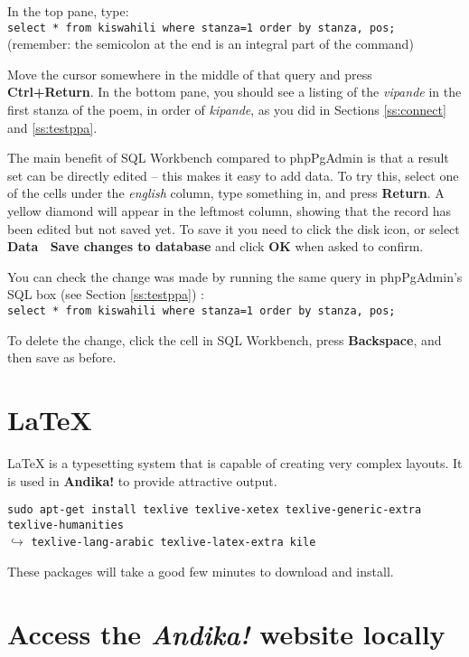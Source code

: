 \documentclass[a4paper,10pt]{article}
\begin{document}
In the top pane, type:\\
\verb|select * from kiswahili where stanza=1 order by stanza, pos;|\\
(remember: the semicolon at the end is an integral part of the command)

Move the cursor somewhere in the middle of that query and press \textbf{Ctrl+Return}.  In the bottom pane, you should see a listing of the \textit{vipande} in the first stanza of the poem, in order of \textit{kipande}, as you did in Sections \ref{ss:connect} and \ref{ss:testppa}.

The main benefit of SQL Workbench compared to phpPgAdmin is that a result set can be directly edited -- this makes it easy to add data.  To try this, select one of the cells under the \textit{english} column, type something in, and press \textbf{Return}.  A yellow diamond will appear in the leftmost column, showing that the record has been edited but not saved yet. To save it you need to click the disk icon, or select \textbf{Data \textrightarrow\ Save changes to database} and click \textbf{OK} when asked to confirm.

You can check the change was made by running the same query in phpPgAdmin's SQL box (see Section \ref{ss:testppa}) :\\
\verb|select * from kiswahili where stanza=1 order by stanza, pos;|

To delete the change, click the cell in SQL Workbench, press \textbf{Backspace}, and then save as before.


\section{LaTeX}

LaTeX is a typesetting system that is capable of creating very complex layouts.  It is used in \textbf{Andika!} to provide attractive output.

\verb|sudo apt-get install texlive texlive-xetex texlive-generic-extra texlive-humanities|\\
$\hookrightarrow$ \verb|texlive-lang-arabic texlive-latex-extra kile|

These packages will take a good few minutes to download and install.


\section{Access the \textit{Andika!} website locally}
\label{s:localaccess}
\end{document}
